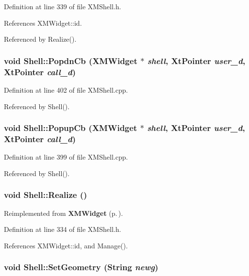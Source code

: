 Definition at line 339 of file XMShell.h.

References XMWidget::id.

Referenced by Realize().
\subsubsection{\setlength{\rightskip}{0pt plus 5cm}void Shell::Popdn\-Cb ({\bf XMWidget} $\ast$ {\em shell}, Xt\-Pointer {\em user\_\-d}, Xt\-Pointer {\em call\_\-d})\hspace{0.3cm}{\tt  [private, virtual]}}\label{classShell_c1}




Definition at line 402 of file XMShell.cpp.

Referenced by Shell().
\subsubsection{\setlength{\rightskip}{0pt plus 5cm}void Shell::Popup\-Cb ({\bf XMWidget} $\ast$ {\em shell}, Xt\-Pointer {\em user\_\-d}, Xt\-Pointer {\em call\_\-d})\hspace{0.3cm}{\tt  [private, virtual]}}\label{classShell_c0}




Definition at line 399 of file XMShell.cpp.

Referenced by Shell().
\subsubsection{\setlength{\rightskip}{0pt plus 5cm}void Shell::Realize ()\hspace{0.3cm}{\tt  [inline]}}\label{classShell_a8}




Reimplemented from {\bf XMWidget} {\rm (p.\,\pageref{classXMWidget_a18})}.

Definition at line 334 of file XMShell.h.

References XMWidget::id, and Manage().
\subsubsection{\setlength{\rightskip}{0pt plus 5cm}void Shell::Set\-Geometry (String {\em newg})\hspace{0.3cm}{\tt  [inline]}}\label{classShell_a4}




